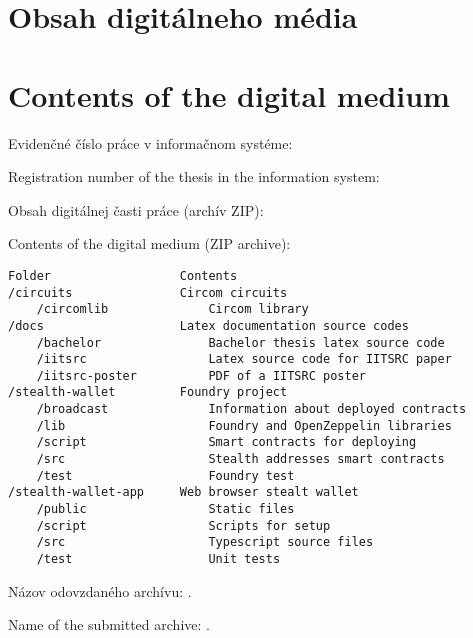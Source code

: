 \thispagestyle{empty}

\ifx\FIITlagEN\undefined
    \chapter{Obsah digitálneho média}
\else
    \chapter{Contents of the digital medium}
\fi

\renewcommand*{\thepage}{B-\arabic{page}}

\ifx\FIITlagEN\undefined
    \par Evidenčné číslo práce v informačnom systéme: \FIITevidenceNumber
\else
    \par Registration number of the thesis in the information system: \FIITevidenceNumber
\fi

\ifx\FIITlagEN\undefined
    \par Obsah digitálnej časti práce (archív ZIP):
\else
    \par Contents of the digital medium (ZIP archive):
\fi

\begin{verbatim}
Folder                  Contents
/circuits               Circom circuits
    /circomlib              Circom library
/docs                   Latex documentation source codes
    /bachelor               Bachelor thesis latex source code   
    /iitsrc                 Latex source code for IITSRC paper
    /iitsrc-poster          PDF of a IITSRC poster
/stealth-wallet         Foundry project
    /broadcast              Information about deployed contracts
    /lib                    Foundry and OpenZeppelin libraries
    /script                 Smart contracts for deploying
    /src                    Stealth addresses smart contracts
    /test                   Foundry test
/stealth-wallet-app     Web browser stealt wallet
    /public                 Static files
    /script                 Scripts for setup
    /src                    Typescript source files
    /test                   Unit tests
\end{verbatim}



\ifx\FIITlagEN\undefined
    \par Názov odovzdaného archívu: \FIITArchiveName.
\else
    \par Name of the submitted archive: \FIITArchiveName.
\fi
